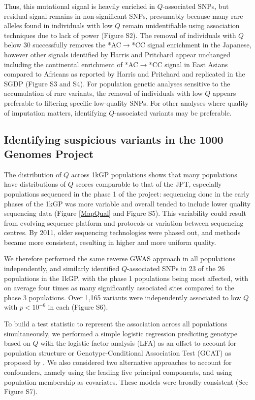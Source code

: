 \documentclass[9pt,article]{template}
\begin{document}
Thus, this mutational signal is heavily enriched in $Q$-associated SNPs, but residual signal remains in non-significant SNPs, presumably because many rare alleles found in individuals with low $Q$ remain unidentifiable using association techniques due to lack of power (Figure S2). %
The removal of individuals with $Q$ below 30 successfully removes the *AC${\rightarrow}$*CC signal enrichment in the Japanese, however other signals identified by Harris and Pritchard appear unchanged including the continental enrichment of *AC${\rightarrow}$*CC signal in East Asians compared to Africans as reported by Harris and Pritchard and replicated in the SGDP (Figure S3 and S4). %
For population genetic analyses sensitive to the accumulation of rare variants, the removal of individuals with low $Q$ appears preferable to filtering specific low-quality SNPs. 
For other analyses where quality of imputation matters, identifying $Q$-associated variants may be preferable. 

\subsection{Identifying suspicious variants in the 1000 Genomes Project}
The distribution of $Q$ across 1kGP populations shows that many populations have distributions of $Q$ scores comparable to that of the JPT, especially populations sequenced in the phase 1 of the project: sequencing done in the early phases of the 1kGP was more variable and overall tended to include lower quality sequencing data (Figure \ref{MapQual} and Figure S5). %
This variability could result from evolving sequence platform and protocols or variation between sequencing centres. 
By 2011, older sequencing technologies were phased out, and methods became more consistent, resulting in higher and more uniform quality.

We therefore performed the same reverse GWAS approach in all populations independently, and similarly identified $Q$-associated SNPs in 23 of the 26 populations in the 1kGP, with the phase 1 populations being most affected, with on average four times as many significantly associated sites compared to the phase 3 populations.
Over 1,165 variants were independently associated to low $Q$ with $ p < 10^{-6}$ in each (Figure S6). %

To build a test statistic to represent the association across all populations simultaneously, we performed a simple logistic regression predicting genotype based on $Q$ with the logistic factor analysis (LFA) as an offset to account for population structure or Genotype-Conditional Association Test  (GCAT) as proposed by \citep{song2015testing}. 
We also considered two alternative approaches to account for confounders, namely using the leading five  principal components, and using population membership as covariates. 
These models were broadly consistent (See Figure S7). %
\end{document}
